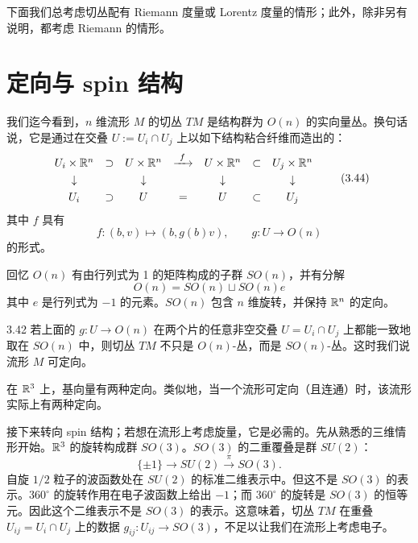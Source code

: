 下面我们总考虑切丛配有 Riemann 度量或 Lorentz 度量的情形；此外，除非另有说明，都考虑 Riemann 的情形。


\section{定向与 spin 结构}

我们迄今看到，$n$ 维流形 $M$ 的切丛 $TM$ 是结构群为 $O(n)$ 的实向量丛。换句话说，它是通过在交叠 $U:=U_i\cap U_j$ 上以如下结构粘合纤维而造出的：
{\small\setlength{\arraycolsep}{4pt}
\[
\begin{array}{ccccccc}
U_i\times\mathbb{R}^n & \supset & U\times\mathbb{R}^n & \xrightarrow{\ f\ } & U\times\mathbb{R}^n & \subset & U_j\times\mathbb{R}^n\\[3pt]
\downarrow & & \downarrow & & \downarrow & & \downarrow\\[3pt]
U_i & \supset & U & = & U & \subset & U_j
\end{array}
\tag{3.44}
\]
}
其中 $f$ 具有
\[
f:(b,v)\mapsto(b,g(b)v),\qquad g:U\to O(n)
\tag{3.45}
\]
的形式。

回忆 $O(n)$ 有由行列式为 1 的矩阵构成的子群 $SO(n)$，并有分解
\[
O(n)=SO(n)\sqcup SO(n)e
\tag{3.46}
\]
其中 $e$ 是行列式为 $-1$ 的元素。$SO(n)$ 包含 $n$ 维旋转，并保持 $\mathbb{R}^n$ 的定向。

\begin{definition}{3.42}
若上面的 $g:U\to O(n)$ 在两个片的任意非空交叠 $U=U_i\cap U_j$ 上都能一致地取在 $SO(n)$ 中，则切丛 $TM$ 不只是 $O(n)$-丛，而是 $SO(n)$-丛。这时我们说流形 $M$ 可定向。
\end{definition}

在 $\mathbb{R}^3$ 上，基向量有两种定向。类似地，当一个流形可定向（且连通）时，该流形实际上有两种定向。

接下来转向 spin 结构；若想在流形上考虑旋量，它是必需的。先从熟悉的三维情形开始。$\mathbb{R}^3$ 的旋转构成群 $SO(3)$。$SO(3)$ 的二重覆叠是群 $SU(2)$：
\[
\{\pm1\}\to SU(2)\xrightarrow{\ \pi\ }SO(3).
\tag{3.47}
\]
自旋 $1/2$ 粒子的波函数处在 $SU(2)$ 的标准二维表示中。但这不是 $SO(3)$ 的表示。$360^\circ$ 的旋转作用在电子波函数上给出 $-1$；而 $360^\circ$ 的旋转是 $SO(3)$ 的恒等元。因此这个二维表示不是 $SO(3)$ 的表示。这意味着，切丛 $TM$ 在重叠 $U_{ij}=U_i\cap U_j$ 上的数据 $g_{ij}:U_{ij}\to SO(3)$，不足以让我们在流形上考虑电子。

